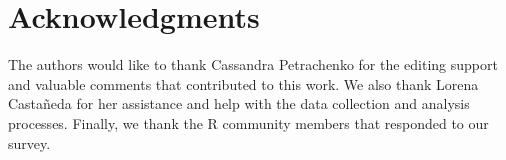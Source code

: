 \documentclass{sig-alternate-05-2015}
\begin{document}


%





\section{Acknowledgments}
The authors would like to thank Cassandra Petrachenko for the editing support and valuable comments that contributed to this work. We also thank Lorena Castañeda for her assistance and help with the data collection and analysis processes.  Finally, we thank the R community members that responded to our survey.



\end{document}
